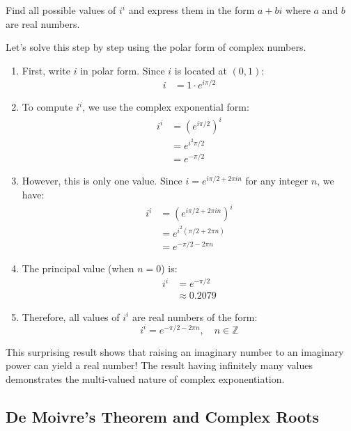\exampleline
\begin{example}
Find all possible values of $i^i$ and express them in the form $a + bi$ where $a$ and $b$ are real numbers.

\begin{solution}
Let's solve this step by step using the polar form of complex numbers.

\begin{enumerate}
\item First, write $i$ in polar form. Since $i$ is located at $(0,1)$:
  \begin{align*}
  i &= 1\cdot e^{i\pi/2}
  \end{align*}

\item To compute $i^i$, we use the complex exponential form:
  \begin{align*}
  i^i &= (e^{i\pi/2})^i \\
  &= e^{i^2\pi/2} \\
  &= e^{-\pi/2}
  \end{align*}

\item However, this is only one value. Since $i = e^{i\pi/2 + 2\pi i n}$ for any integer $n$, we have:
  \begin{align*}
  i^i &= (e^{i\pi/2 + 2\pi i n})^i \\
  &= e^{i^2(\pi/2 + 2\pi n)} \\
  &= e^{-\pi/2 - 2\pi n}
  \end{align*}

\item The principal value (when $n = 0$) is:
  \begin{align*}
  i^i &= e^{-\pi/2} \\
  &\approx 0.2079
  \end{align*}

\item Therefore, all values of $i^i$ are real numbers of the form:
  \[
  i^i = e^{-\pi/2 - 2\pi n}, \quad n \in \mathbb{Z}
  \]
\end{enumerate}

\noindent This surprising result shows that raising an imaginary number to an imaginary power can yield a real number! The result having infinitely many values demonstrates the multi-valued nature of complex exponentiation.
\end{solution}
\end{example}
\exampleline

\subsection*{De Moivre's Theorem and Complex Roots}  

